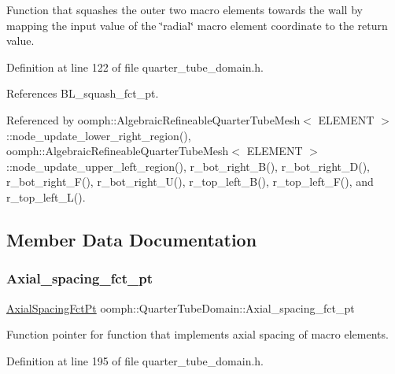 Function that squashes the outer two macro elements towards the wall by mapping the input value of the \char`\"{}radial\char`\"{} macro element coordinate to the return value. 



Definition at line 122 of file quarter\+\_\+tube\+\_\+domain.\+h.



References B\+L\+\_\+squash\+\_\+fct\+\_\+pt.



Referenced by oomph\+::\+Algebraic\+Refineable\+Quarter\+Tube\+Mesh$<$ E\+L\+E\+M\+E\+N\+T $>$\+::node\+\_\+update\+\_\+lower\+\_\+right\+\_\+region(), oomph\+::\+Algebraic\+Refineable\+Quarter\+Tube\+Mesh$<$ E\+L\+E\+M\+E\+N\+T $>$\+::node\+\_\+update\+\_\+upper\+\_\+left\+\_\+region(), r\+\_\+bot\+\_\+right\+\_\+\+B(), r\+\_\+bot\+\_\+right\+\_\+\+D(), r\+\_\+bot\+\_\+right\+\_\+\+F(), r\+\_\+bot\+\_\+right\+\_\+\+U(), r\+\_\+top\+\_\+left\+\_\+\+B(), r\+\_\+top\+\_\+left\+\_\+\+F(), and r\+\_\+top\+\_\+left\+\_\+\+L().



\subsection{Member Data Documentation}
\mbox{\label{classoomph_1_1QuarterTubeDomain_ad084b0e50d50b1948c2e9a600e3dcbd0}} 
\subsubsection{\texorpdfstring{Axial\+\_\+spacing\+\_\+fct\+\_\+pt}{Axial\_spacing\_fct\_pt}}
{\footnotesize\ttfamily \hyperlink{classoomph_1_1QuarterTubeDomain_ae347af42a5dcb9b3b82c2247975b01db}{Axial\+Spacing\+Fct\+Pt} oomph\+::\+Quarter\+Tube\+Domain\+::\+Axial\+\_\+spacing\+\_\+fct\+\_\+pt\hspace{0.3cm}{\ttfamily [private]}}



Function pointer for function that implements axial spacing of macro elements. 



Definition at line 195 of file quarter\+\_\+tube\+\_\+domain.\+h.



